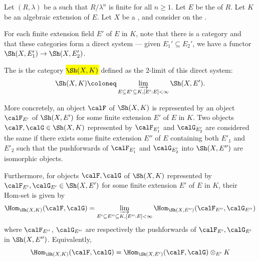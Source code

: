 \begin{definition} \label{definition:category_of_etale_sheaves_with_rational_coefficients_in_an_algebraic_extension_of_the_fraction_field_of_a_complete_dvr}
    Let $(R, \lambda)$ be a   such that $R/\lambda^n$ is finite for all $n \geq 1$. Let $E$ be the  of $R$. Let $K$ be an algebraic extension of $E$. Let $X$ be a , and consider  on the . 

    For each finite extension field $E'$ of $E$ in $K$, note that there is a category  and that these categories form a direct system --- given $E_1' \subseteq E_2'$, we have a functor $\Sh(X, E_1') \to \Sh(X, E_2')$.

    The  is the category \hl{$\Sh(X,K)$} defined as the $2$-limit of this direct system:
    $$\Sh(X,K) \coloneq \varinjlim_{E \subseteq E' \subseteq K, [E':E] < \infty} \Sh(X,E').$$

    More concretely, an object $\calF$ of $\Sh(X,K)$ is represented by an object $\calF_{E'}$ of $\Sh(X,E')$ for some finite extension $E'$ of $E$ in $K$. Two objects $\calF, \calG \in \Sh(X,K)$ represented by $\calF_{E'_1}$ and $\calG_{E'_2}$ are considered the same if there exists some finite extension $E''$ of $E$ containing both $E'_1$ and $E'_2$ such that the pushforwards of $\calF_{E'_1}$ and $\calG_{E'_2}$ into $\Sh(X, E'')$ are isomorphic objects.
    
    Furthermore, for objects $\calF, \calG$ of $\Sh(X,K)$ represented by $\calF_{E'}, \calG_{E'} \in \Sh(X, E')$ for some finite extension $E'$ of $E$ in $K$, their Hom-set is given by 
    $$\Hom_{\Sh(X,K)}(\calF, \calG) = \varinjlim_{E' \subseteq E'' \subseteq K, [E'':E] < \infty} \Hom_{\Sh(X,E'')}(\calF_{E''}, \calG_{E''})$$
    where $\calF_{E''}$, $\calG_{E''}$ are respectively the pushforwards of $\calF_{E'}, \calG_{E'}$ in $\Sh(X,E'')$. Equivalently, 
    $$\Hom_{\Sh(X,K)}(\calF, \calG) = \Hom_{\Sh(X,E')}(\calF, \calG) \otimes_{E'} K$$


\end{definition}
